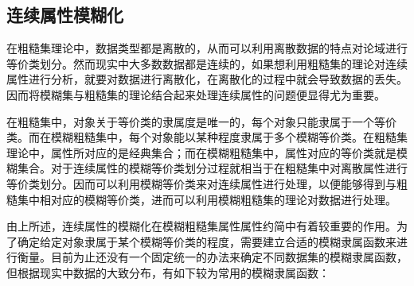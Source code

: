 \subsection{连续属性模糊化}

在粗糙集理论中，数据类型都是离散的，从而可以利用离散数据的特点对论域进行等价类划分。然而现实中大多数数据都是连续的，如果想利用粗糙集的理论对连续属性进行分析，就要对数据进行离散化，在离散化的过程中就会导致数据的丢失。因而将模糊集与粗糙集的理论结合起来处理连续属性的问题便显得尤为重要。

在粗糙集中，对象关于等价类的隶属度是唯一的，每个对象只能隶属于一个等价类。而在模糊粗糙集中，每个对象能以某种程度隶属于多个模糊等价类。在粗糙集理论中，属性所对应的是经典集合；而在模糊粗糙集中，属性对应的等价类就是模糊集合。对于连续属性的模糊等价类划分过程就相当于在粗糙集中对离散属性进行等价类划分。因而可以利用模糊等价类来对连续属性进行处理，以便能够得到与粗糙集中相对应的模糊等价类，进而可以利用模糊粗糙集的理论对数据进行处理\cite{基于粗糙集和模糊粗糙集的属性约简研究}。

由上所述，连续属性的模糊化在模糊粗糙集属性属性约简中有着较重要的作用。为了确定给定对象隶属于某个模糊等价类的程度，需要建立合适的模糊隶属函数来进行衡量。目前为止还没有一个固定统一的办法来确定不同数据集的模糊隶属函数，但根据现实中数据的大致分布，有如下较为常用的模糊隶属函数：



